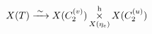 \documentclass[preview]{standalone}
\begin{document}
\begin{align*}
\special{dvisvgm:raw <g id='unique000'>}X(T) \xrightarrow{\;\sim\;} X(C_2^{(v)}) \mathop{\times}\limits^{\mathrm{h}}_{X(\eta_e)} X(C_2^{(u)})\special{dvisvgm:raw </g>}
\end{align*}
\end{document}
